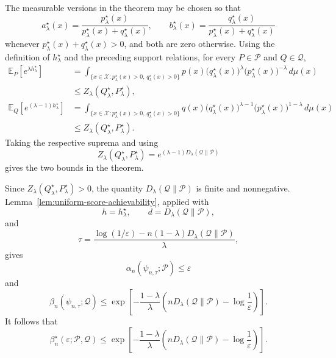 \documentclass[journal,12pt,draftclsnofoot,onecolumn]{IEEEtran}
\begin{document}
\begin{IEEEproof}
The measurable versions in the theorem may be chosen so that
\begin{equation*}
a_\lambda^\star(x)
=
\frac{p_\lambda^\star(x)}
     {p_\lambda^\star(x)+q_\lambda^\star(x)},
\qquad
b_\lambda^\star(x)
=
\frac{q_\lambda^\star(x)}
     {p_\lambda^\star(x)+q_\lambda^\star(x)}
\end{equation*}
whenever
$p_\lambda^\star(x)+q_\lambda^\star(x)>0$, and both are zero otherwise.
Using the definition of $h_\lambda^\star$ and the preceding support
relations, for every $P\in\mathcal P$ and $Q\in\mathcal Q$,
\begin{equation*}
\begin{aligned}
\mathbb E_P
\left[
e^{\lambda h_\lambda^\star}
\right]
&=
\int_{\{x\in\mathcal X:
p_\lambda^\star(x)>0,\,
q_\lambda^\star(x)>0\}}
p(x)
\bigl(q_\lambda^\star(x)\bigr)^\lambda
\bigl(p_\lambda^\star(x)\bigr)^{-\lambda}
\,d\mu(x)
\\
&\leq
Z_\lambda(Q_\lambda^\star,P_\lambda^\star),
\\
\mathbb E_Q
\left[
e^{(\lambda-1)h_\lambda^\star}
\right]
&=
\int_{\{x\in\mathcal X:
p_\lambda^\star(x)>0,\,
q_\lambda^\star(x)>0\}}
q(x)
\bigl(q_\lambda^\star(x)\bigr)^{\lambda-1}
\bigl(p_\lambda^\star(x)\bigr)^{1-\lambda}
\,d\mu(x)
\\
&\leq
Z_\lambda(Q_\lambda^\star,P_\lambda^\star).
\end{aligned}
\end{equation*}
Taking the respective suprema and using
\begin{equation*}
Z_\lambda(Q_\lambda^\star,P_\lambda^\star)
=
e^{(\lambda-1)D_\lambda(\mathcal Q\|\mathcal P)}
\end{equation*}
gives the two bounds in the theorem.

Since
$Z_\lambda(Q_\lambda^\star,P_\lambda^\star)>0$,
the quantity $D_\lambda(\mathcal Q\|\mathcal P)$ is finite and
nonnegative. Lemma~\ref{lem:uniform-score-achievability}, applied with
\begin{equation*}
h=h_\lambda^\star,
\qquad
d=D_\lambda(\mathcal Q\|\mathcal P),
\end{equation*}
and
\begin{equation*}
\tau
=
\frac{
\log(1/\varepsilon)
-
n(1-\lambda)D_\lambda(\mathcal Q\|\mathcal P)
}{
\lambda
},
\end{equation*}
gives
\begin{equation*}
\alpha_n(\psi_{n,\tau};\mathcal P)
\leq
\varepsilon
\end{equation*}
and
\begin{equation*}
\beta_n(\psi_{n,\tau};\mathcal Q)
\leq
\exp\left[
-\frac{1-\lambda}{\lambda}
\left(
nD_\lambda(\mathcal Q\|\mathcal P)
-
\log\frac{1}{\varepsilon}
\right)
\right].
\end{equation*}
It follows that
\begin{equation*}
\beta_n^\star(\varepsilon;\mathcal P,\mathcal Q)
\leq
\exp\left[
-\frac{1-\lambda}{\lambda}
\left(
nD_\lambda(\mathcal Q\|\mathcal P)
-
\log\frac{1}{\varepsilon}
\right)
\right].
\end{equation*}


\end{IEEEproof}
\end{document}
